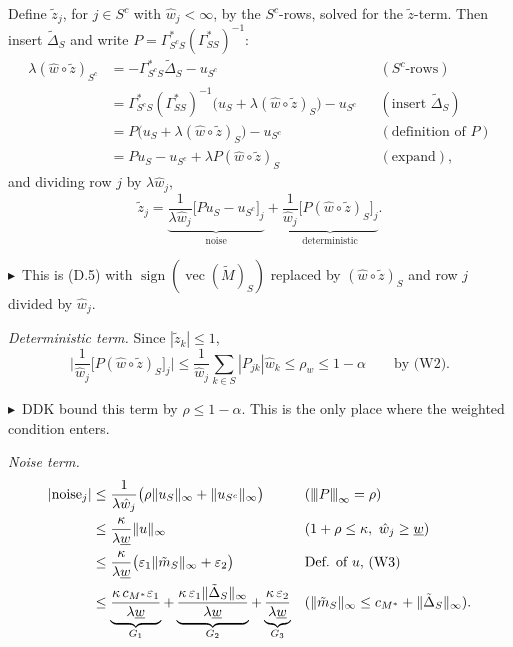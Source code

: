 \documentclass[11pt,a4paper]{article}
\numberwithin{equation}{section}
\theoremstyle{plain}
\theoremstyle{remark}
\newcommand{\opnorm}[1]{{\vert\kern-0.25ex\vert\kern-0.25ex\vert #1 \vert\kern-0.25ex\vert\kern-0.25ex\vert}}
\DeclareMathOperator{\vect}{vec}
\DeclareMathOperator{\sign}{sign}
\newcommand{\changed}{$\blacktriangleright$\ }
\begin{document}
Define $\tilde z_j$, for $j\in S^c$ with $\hat w_j<\infty$, by the $S^c$-rows, solved for the $\tilde z$-term. Then insert $\tilde\Delta_S$ and write $P=\Gamma^*_{S^cS}(\Gamma^*_{SS})^{-1}$:
\begin{align*}
\lambda(\hat w\circ\tilde z)_{S^c}
&=-\Gamma^*_{S^cS}\tilde\Delta_S-u_{S^c} && (S^c\text{-rows})\\
&=\Gamma^*_{S^cS}(\Gamma^*_{SS})^{-1}\big(u_S+\lambda(\hat w\circ\tilde z)_S\big)-u_{S^c} && (\text{insert }\tilde\Delta_S)\\
&=P\big(u_S+\lambda(\hat w\circ\tilde z)_S\big)-u_{S^c} && (\text{definition of }P)\\
&=Pu_S-u_{S^c}+\lambda P(\hat w\circ\tilde z)_S && (\text{expand}),
\end{align*}
and dividing row $j$ by $\lambda\hat w_j$,
\begin{equation}\label{eq:dual}
\tilde z_j=\underbrace{\frac{1}{\lambda\hat w_j}\big[Pu_S-u_{S^c}\big]_j}_{\text{noise}}+\underbrace{\frac{1}{\hat w_j}\big[P(\hat w\circ\tilde z)_S\big]_j}_{\text{deterministic}} .
\end{equation}

\changed This is (D.5) with $\sign(\vect(\tilde M)_S)$ replaced by $(\hat w\circ\tilde z)_S$ and row $j$ divided by $\hat w_j$.

\emph{Deterministic term.} Since $|\tilde z_k|\le1$,
\begin{equation}\label{eq:det}
\Big|\frac{1}{\hat w_j}\big[P(\hat w\circ\tilde z)_S\big]_j\Big|\le\frac{1}{\hat w_j}\sum_{k\in S}|P_{jk}|\hat w_k\le\rho_w\le1-\alpha\qquad\text{by (W2)}.
\end{equation}

\changed DDK bound this term by $\rho\le1-\alpha$. This is the only place where the weighted condition enters.

\emph{Noise term.}
\begin{align}
|\text{noise}_j|
&\le\frac{1}{\lambda\hat w_j}\big(\rho\|u_S\|_\infty+\|u_{S^c}\|_\infty\big) && (\opnorm{P}_\infty=\rho)\notag\\
&\le\frac{\kappa}{\lambda\underline w}\|u\|_\infty && (1+\rho\le\kappa,\ \hat w_j\ge\underline w)\notag\\
&\le\frac{\kappa}{\lambda\underline w}\big(\varepsilon_1\|\tilde m_S\|_\infty+\varepsilon_2\big) && \text{Def. of $u$, (W3)}\notag\\
&\le\underbrace{\frac{\kappa\,c_{M^*}\varepsilon_1}{\lambda\underline w}}_{G_1}+\underbrace{\frac{\kappa\,\varepsilon_1\|\tilde\Delta_S\|_\infty}{\lambda\underline w}}_{G_2}+\underbrace{\frac{\kappa\,\varepsilon_2}{\lambda\underline w}}_{G_3} && (\|\tilde m_S\|_\infty\le c_{M^*}+\|\tilde\Delta_S\|_\infty).\label{eq:noise}
\end{align}
\end{document}

